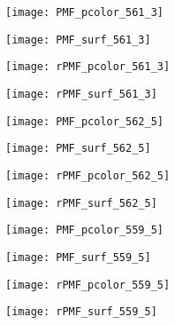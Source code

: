 \begin{figure} [h!]	
  	\centering
	\begin{subfigure}[b]{0.24\textwidth}
                \texttt{[image: PMF\_pcolor\_561\_3]}
		\caption{}
  	\end{subfigure}
  	\centering
	\begin{subfigure}[b]{0.24\textwidth}
                \texttt{[image: PMF\_surf\_561\_3]}
		\caption{}
  	\end{subfigure}
  	\centering
	\begin{subfigure}[b]{0.24\textwidth}
                \texttt{[image: rPMF\_pcolor\_561\_3]}
		\caption{}
  	\end{subfigure}
  	\centering
	\begin{subfigure}[b]{0.24\textwidth}
                \texttt{[image: rPMF\_surf\_561\_3]}
		\caption{}
  	\end{subfigure}
  		  	
  	\centering
	\begin{subfigure}[b]{0.24\textwidth}
                \texttt{[image: PMF\_pcolor\_562\_5]}
		\caption{}
  	\end{subfigure}
  	\centering
	\begin{subfigure}[b]{0.24\textwidth}
                \texttt{[image: PMF\_surf\_562\_5]}
		\caption{}
  	\end{subfigure}
  	\centering
	\begin{subfigure}[b]{0.24\textwidth}
                \texttt{[image: rPMF\_pcolor\_562\_5]}
		\caption{}
  	\end{subfigure}
  	\centering
	\begin{subfigure}[b]{0.24\textwidth}
                \texttt{[image: rPMF\_surf\_562\_5]}
		\caption{}
  	\end{subfigure}
  	
  	\centering
	\begin{subfigure}[b]{0.24\textwidth}
                \texttt{[image: PMF\_pcolor\_559\_5]}
		\caption{}
  	\end{subfigure}
  	\centering
	\begin{subfigure}[b]{0.24\textwidth}
                \texttt{[image: PMF\_surf\_559\_5]}
		\caption{}
  	\end{subfigure}
  	\centering
	\begin{subfigure}[b]{0.24\textwidth}
                \texttt{[image: rPMF\_pcolor\_559\_5]}
		\caption{}
  	\end{subfigure}
  	\centering
	\begin{subfigure}[b]{0.24\textwidth}
                \texttt{[image: rPMF\_surf\_559\_5]}
		\caption{}
  	\end{subfigure}
  	

\end{figure}
